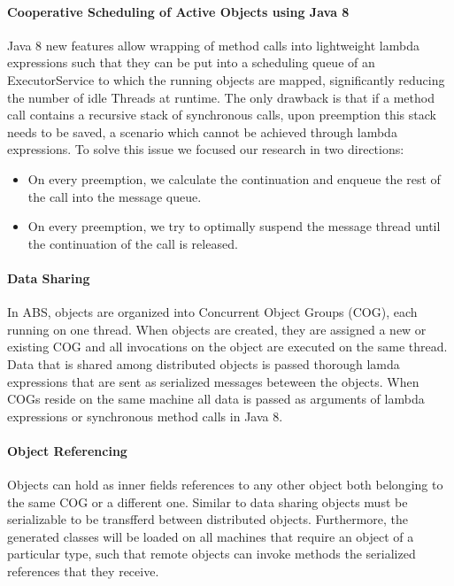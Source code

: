 \paragraph{Cooperative Scheduling of Active Objects using Java 8}
\par Java 8 new features allow wrapping of method calls into lightweight lambda expressions such that they can be put into a scheduling queue of an ExecutorService to which the running objects are mapped, significantly reducing the number of idle Threads at runtime.  The only drawback is that if a method call contains a recursive stack of synchronous calls, upon preemption this stack needs to be saved, a scenario which cannot be achieved through lambda expressions. To solve this issue we focused our research in two directions:
\begin{itemize}
	\item On every preemption, we calculate the continuation and enqueue the rest of the call into the message queue.
	\item On every preemption, we try to optimally suspend the message thread until the continuation of the call is released.
\end{itemize}

\paragraph{Data Sharing}
In ABS, objects are organized into Concurrent Object Groups (COG), each running on one thread. When objects are created, they are assigned a new or existing COG and all invocations on the object are executed on the same thread. Data that is shared among distributed objects is passed thorough lamda expressions that are sent as serialized messages beteween the objects. When COGs reside on the same machine all data is passed as arguments of lambda expressions or synchronous method calls in Java 8.

\paragraph{Object Referencing} 
Objects can hold as inner fields references to any other object both belonging to the same COG or a different one. Similar to data sharing objects must be serializable to be transfferd between distributed objects. Furthermore, the generated classes will be loaded on all machines that require an object of a particular type, such that remote objects can invoke methods the serialized references that they receive. 
%

